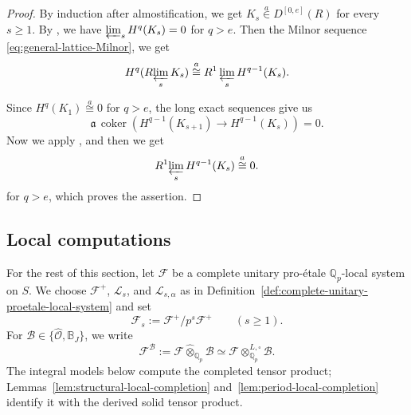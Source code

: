 \documentclass[11pt]{article}
\theoremstyle{definition}
\newcommand{\Qp}{\mathbb Q_p}
\newcommand{\acong}{\mathrel{\overset{a}{\cong}}}
\newcommand{\ain}{\mathrel{\overset{a}{\in}}}
\begin{document}
\begin{proof}
By induction after almostification, we get
\(K_s\ain D^{[0,e]}(R)\) for every \(s\geq1\).
By \cite[Lemma~2.4.2(ii)]{GabberRamero}, we have $\varprojlim_sH^q(K_s)=0$ for $q>e$. 
Then the Milnor sequence \eqref{eq:general-lattice-Milnor}, we get
\[
 H^q(R\!\varprojlim_s K_s)\acong R^1\varprojlim_sH^{q-1}(K_s).
\]

Since \(H^{q}(K_1)\acong0\) for $q>e$, the long exact sequences give us
\[
 \mathfrak a\,\operatorname{coker}\!\left(
 H^{q-1}(K_{s+1})\longrightarrow H^{q-1}(K_s)
 \right)=0.
\]
Now we apply \cite[Lemma~2.4.2(iii)]{GabberRamero}, and then we get
\[
 R^1\!\varprojlim_s H^{q-1}(K_s)\acong0.
\]for $q>e$, 
which proves the assertion.
\end{proof}



\subsection{Local computations}
For the rest of this section, let \(\mathcal F\) be a complete unitary
pro-\'etale \(\Qp\)-local system on \(S\).  We choose
\(\mathcal F^+\), \(\mathcal L_s\), and \(\mathcal L_{s,\alpha}\) as in
Definition~\ref{def:complete-unitary-proetale-local-system} and set
\[
 \mathcal F_s:=\mathcal F^+/p^s\mathcal F^+\qquad(s\geq1).
\]
For \(\mathscr B\in\{\widehat{\mathscr O},\mathbb B_J\}\), we write
\[
 \mathcal F^{\mathscr B}
 :=\mathcal F\widehat\otimes_{\Qp}\mathscr B
 \simeq\mathcal F\otimes_{\Qp}^{L,\square}\mathscr B.
\]
The integral models below compute the completed tensor product;
Lemmas~\ref{lem:structural-local-completion}
and~\ref{lem:period-local-completion} identify it with the derived
solid tensor product.
\end{document}
